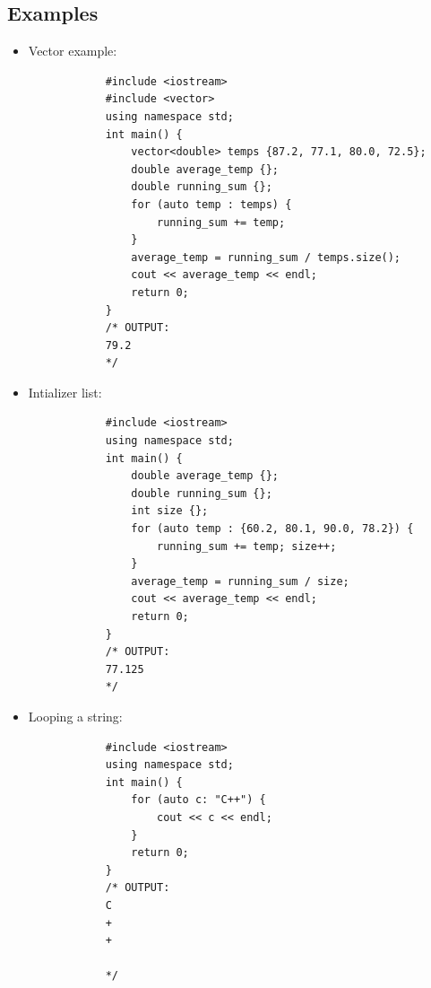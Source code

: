 \subsection{Examples}
\begin{itemize}
    \item Vector example:
        \begin{verbatim}
            #include <iostream>
            #include <vector>
            using namespace std;
            int main() {
                vector<double> temps {87.2, 77.1, 80.0, 72.5};
                double average_temp {};
                double running_sum {};
                for (auto temp : temps) {
                    running_sum += temp;
                }
                average_temp = running_sum / temps.size();
                cout << average_temp << endl;
                return 0;
            }
            /* OUTPUT:
            79.2
            */
        \end{verbatim}
    
    \item Intializer list:
        \begin{verbatim}
            #include <iostream>
            using namespace std;
            int main() {
                double average_temp {};
                double running_sum {};
                int size {};
                for (auto temp : {60.2, 80.1, 90.0, 78.2}) {
                    running_sum += temp; size++;
                }
                average_temp = running_sum / size;
                cout << average_temp << endl;
                return 0;
            }
            /* OUTPUT:
            77.125
            */
        \end{verbatim}
    
    \item Looping a string:
        \begin{verbatim}
            #include <iostream>
            using namespace std;
            int main() {
                for (auto c: "C++") {
                    cout << c << endl;
                }
                return 0;
            }
            /* OUTPUT:
            C
            +
            +

            */
        \end{verbatim}
\end{itemize}


